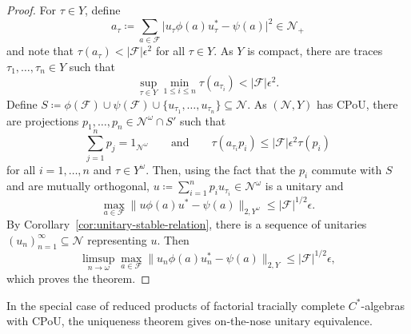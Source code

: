 \documentclass[a4paper,11pt]{amsart}
\theoremstyle{definition}
\numberwithin{equation}{section}
\numberwithin{theorem}{section}
\begin{document}
\begin{proof}
	For $\tau \in Y$, define
	\begin{equation}
		a_\tau \coloneqq \sum_{a \in \mathcal F} \big|u_\tau \phi(a) u_\tau^* - \psi(a) \big|^2 \in \mathcal N_+
	\end{equation}
	and note that $\tau(a_\tau) < |\mathcal F|\epsilon^2$ for all $\tau \in Y$.  As $Y$ is compact, there are traces $\tau_1, \ldots, \tau_n \in Y$ such that 
	\begin{equation}
		\sup_{\tau \in Y} \min_{1 \leq i \leq n} \tau(a_{\tau_i}) < |\mathcal F| \epsilon^2. 
	\end{equation}
	Define $S \coloneqq \phi(\mathcal F) \cup \psi(\mathcal F) \cup \{u_{\tau_1}, \ldots, u_{\tau_n} \} \subseteq \mathcal N$.  As $(\mathcal N, Y)$ has CPoU, there are projections $p_1, \ldots, p_n \in \mathcal N^\omega \cap S'$ such that 
	\begin{equation}
		\sum_{j=1}^n p_j = 1_{\mathcal N^\omega} \qquad \text{and} \qquad \tau(a_{\tau_i} p_i) \leq |\mathcal F|\epsilon^2 \tau(p_i)
	\end{equation}
	for all $i= 1, \ldots, n$ and $\tau \in Y^\omega$.  Then, using the fact that the $p_i$ commute with $S$ and are mutually orthogonal, $u \coloneqq \sum_{i=1}^n p_i u_{\tau_i} \in \mathcal N^\omega$ is a unitary and 
	\begin{equation}
		\max_{a \in \mathcal F} \|u \phi(a) u^* - \psi(a) \|_{2, Y^\omega} \leq |\mathcal F|^{1/2} \epsilon.
	\end{equation}
	By Corollary~\ref{cor:unitary-stable-relation}, there is a sequence of unitaries $(u_n)_{n=1}^\infty \subseteq \mathcal N$ representing $u$.  Then
	\begin{equation}
		\limsup_{n \rightarrow \omega} \max_{a \in \mathcal F} \|u_n \phi(a) u_n^* - \psi(a) \|_{2, Y} \leq |\mathcal F|^{1/2} \epsilon,
	\end{equation}
	which proves the theorem.
\end{proof}

In the special case of reduced products of factorial tracially complete $C^*$-algebras with CPoU, the uniqueness theorem gives on-the-nose unitary equivalence.
\end{document}
